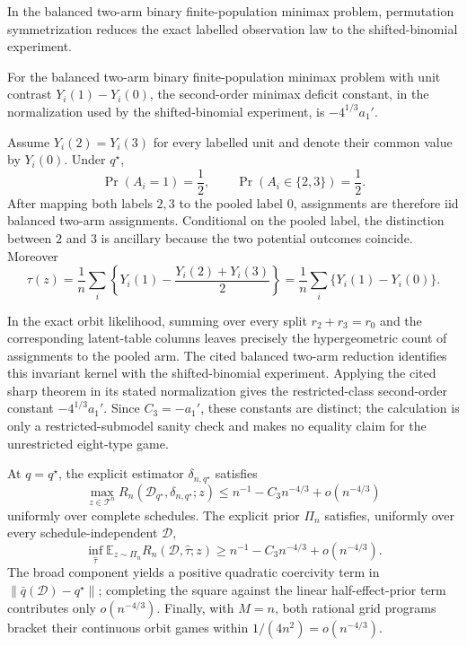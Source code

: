 In the balanced two-arm binary finite-population minimax problem, permutation symmetrization reduces the exact labelled observation law to the shifted-binomial experiment.

For the balanced two-arm binary finite-population minimax problem with unit contrast \(Y_i(1)-Y_i(0)\), the second-order minimax deficit constant, in the normalization used by the shifted-binomial experiment, is \(-4^{1/3}a_1'\).

Assume \(Y_i(2)=Y_i(3)\) for every labelled unit and denote their common value by \(Y_i(0)\).  Under \(q^\star\),
\[
\Pr(A_i=1)=\frac12,\qquad
\Pr(A_i\in\{2,3\})=\frac12.
\]
After mapping both labels \(2,3\) to the pooled label \(0\), assignments are therefore iid balanced two-arm assignments.  Conditional on the pooled label, the distinction between \(2\) and \(3\) is ancillary because the two potential outcomes coincide.  Moreover
\[
\tau(z)=\frac1n\sum_i
\left\{Y_i(1)-\frac{Y_i(2)+Y_i(3)}2\right\}
=\frac1n\sum_i\{Y_i(1)-Y_i(0)\}.
\]

In the exact orbit likelihood, summing over every split \(r_2+r_3=r_0\) and the corresponding latent-table columns leaves precisely the hypergeometric count of assignments to the pooled arm.  The cited balanced two-arm reduction identifies this invariant kernel with the shifted-binomial experiment.  Applying the cited sharp theorem in its stated normalization gives the restricted-class second-order constant \(-4^{1/3}a_1'\).  Since \(C_3=-a_1'\), these constants are distinct; the calculation is only a restricted-submodel sanity check and makes no equality claim for the unrestricted eight-type game.

At \(q=q^\star\), the explicit estimator \(\delta_{n,q^\star}\) satisfies
\[
\max_{z\in\mathcal T^n}R_n(\mathcal D_{q^\star},\delta_{n,q^\star};z)
\leq n^{-1}-C_3n^{-4/3}+o(n^{-4/3})
\]
uniformly over complete schedules.  The explicit prior \(\Pi_n\) satisfies, uniformly over every schedule-independent \(\mathcal D\),
\[
\inf_{\widehat\tau}\mathbb E_{z\sim\Pi_n}
R_n(\mathcal D,\widehat\tau;z)
\geq n^{-1}-C_3n^{-4/3}+o(n^{-4/3}).
\]
The broad component yields a positive quadratic coercivity term in
\(\|\bar q(\mathcal D)-q^\star\|\); completing the square against the linear half-effect-prior term contributes only \(o(n^{-4/3})\).  Finally, with \(M=n\), both rational grid programs bracket their continuous orbit games within \(1/(4n^2)=o(n^{-4/3})\).

